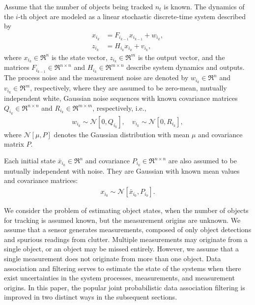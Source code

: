 Assume that the number of objects being tracked $n_t$ is known.
The dynamics of the $i$-th object are modeled as a linear stochastic discrete-time system described by
\begin{align}
x_{i_{k}} & = F_{i_{k-1}} x_{i_{k-1}} + w_{i_{k}},\label{eqn:xkp}\\
z_{i_k} & = H_{i_k} x_{i_k} + v_{i_k},\label{eqn:zlin}
\end{align}
where $x_{i_k}\in\Re^n$ is the state vector, $z_{i_k}\in\Re^m$ is the output vector, and  the matrices $F_{i_{k-1}}\in\Re^{n\times n}$ and $H_{i_k}\in\Re^{m\times n}$ describe system dynamics and outputs.
The process noise and the measurement noise are denoted by $w_{i_k}\in\Re^n$ and $v_{i_k}\in\Re^m$, respectively, where they are assumed to be zero-mean, mutually independent white, Gaussian noise sequences with known covariance matrices $Q_{i_k}\in\Re^{n\times n}$ and $R_{i_k}\in\Re^{m\times m}$, respectively, i.e.,
\begin{align}
w_{i_k} \sim \mathcal{N}[0,Q_{i_k}],\quad
v_{i_k} \sim \mathcal{N}[0,R_{i_k}],
\end{align}
where $\mathcal{N}[\mu,P]$ denotes the Gaussian distribution with mean $\mu$ and covariance matrix $P$.

Each initial state $\bar x_{i_0}\in\Re^n$ and covariance $P_{i_0}\in\Re^{n\times n}$ are also assumed to be mutually independent with noise. They are Gaussian with known mean values and covariance matrices:
\begin{align}
x_{i_0} \sim \mathcal{N}[\bar x_{i_0}, P_{i_0}].\label{eqn:xi0}
\end{align}

We consider the problem of estimating object states, when the number of objects for tracking is assumed known, but the measurement origins are unknown.
We assume that a sensor generates measurements, composed of only object detections and spurious readings from clutter.
Multiple measurements may originate from a single object, or an object may be missed entirely.
However, we assume that a single measurement does not originate from more than one object.
Data association and filtering serves to estimate the state of the systems when there exist uncertainties in the system processes, measurements, and measurement origins. In this paper, the popular joint probabilistic data association filtering is improved in two distinct ways in the subsequent sections.



